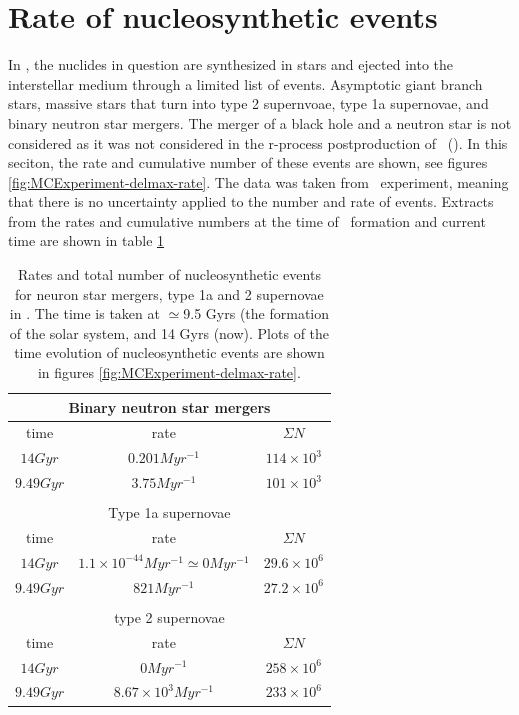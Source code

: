 \section{Rate of nucleosynthetic events}
In \omegamodel, the nuclides in question are synthesized in stars and ejected into the interstellar medium through a limited list of events.
Asymptotic giant branch stars, massive stars that turn into type 2 supernvoae, type 1a supernovae, and binary neutron star mergers.
The merger of a black hole and a neutron star is not considered as it was not considered in the r-process postproduction of \eris\ ().
In this seciton, the rate and cumulative number of these events are shown, see figures \ref{fig:MCExperiment-delmax-rate}.
The data was taken from \expone\ experiment, meaning that there is no uncertainty applied to the number and rate of events.
Extracts from the rates and cumulative numbers at the time of \sos\ formation and current time are shown in table \ref{tab:nucleosynthetic-events}

\begin{table}[h]
  \centering
  \begin{tabular}{|c|c|c|}
    \multicolumn{3}{c}{Binary neutron star mergers} \\ \hline
    time & rate & $\Sigma N$ \\ \hline 
    $14 Gyr$ & $0.201 Myr^{-1}$ & $114 \times 10^3$ \\ \hline 
    $9.49 Gyr$ & $3.75 Myr^{-1}$ & $101 \times 10^3$ \\ \hline
    \multicolumn{3}{c}{} \\
    \multicolumn{3}{c}{Type 1a supernovae} \\ \hline
    time & rate & $\Sigma N$ \\ \hline 
    $14 Gyr$ & $1.1 \times 10^{-44} Myr^{-1} \simeq 0 Myr^{-1}$ & $29.6 \times 10^{6}$ \\ \hline 
    $9.49 Gyr$ & $821 Myr^{-1}$ & $27.2 \times 10^{6}$ \\ \hline
    \multicolumn{3}{c}{} \\
    \multicolumn{3}{c}{type 2 supernovae} \\ \hline
    time & rate & $\Sigma N$ \\ \hline 
    $14 Gyr$ & $0 Myr^{-1}$ & $258 \times 10^{6}$ \\ \hline 
    $9.49 Gyr$ & $8.67 \times 10^{3} Myr^{-1}$ & $233 \times 10^{6}$ \\ \hline
  \end{tabular}
  \caption[Rates and numbers of nucleosynthetic events in \expone]{\label{tab:nucleosynthetic-events}
    Rates and total number of nucleosynthetic events for neuron star mergers, type 1a and 2 supernovae in \omegamodel.
    The time is taken at $\simeq$9.5 Gyrs (the formation of the solar system, and 14 Gyrs (now).
    Plots of the time evolution of nucleosynthetic events are shown in figures \ref{fig:MCExperiment-delmax-rate}.
  }
\end{table}

